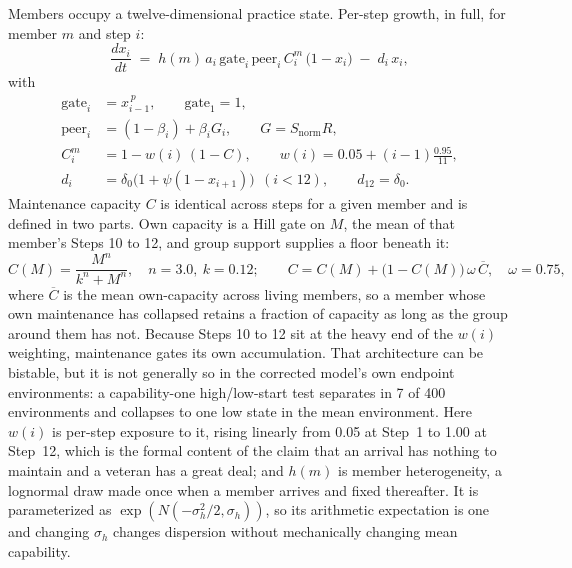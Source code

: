 \documentclass[11pt,a4paper]{article}
\begin{document}
Members occupy a twelve-dimensional practice state. Per-step growth, in full, for
member $m$ and step $i$:
\begin{equation}
\frac{dx_i}{dt} \;=\; h(m)\, a_i\, \mathrm{gate}_i\, \mathrm{peer}_i\, C^{m}_i\,\bigl(1 - x_i\bigr)
 \;-\; d_i\, x_i,
\label{eq:growth}
\end{equation}
with
\begin{align}
\mathrm{gate}_i &= x_{i-1}^{\,p}, \qquad \mathrm{gate}_1 = 1, \\
\mathrm{peer}_i &= (1-\beta_i) + \beta_i G_i, \qquad G = S_{\text{norm}} R, \\
C^{m}_i &= 1 - w(i)\,(1 - C), \qquad w(i) = 0.05 + (i-1)\tfrac{0.95}{11}, \\
d_i &= \delta_0\bigl(1 + \psi(1 - x_{i+1})\bigr) \ \ (i < 12), \qquad d_{12} = \delta_0 .
\end{align}
Maintenance capacity $C$ is identical across steps for a given member and is
defined in two parts. Own capacity is a Hill gate on $M$, the mean of that member's
Steps 10 to 12, and group support supplies a floor beneath it:
\begin{equation}
C(M) = \frac{M^{n}}{k^{n} + M^{n}}, \quad n = 3.0,\ k = 0.12;
\qquad
C = C(M) + \bigl(1 - C(M)\bigr)\,\omega\,\overline{C}, \quad \omega = 0.75,
\label{eq:capacity}
\end{equation}
where $\overline{C}$ is the mean own-capacity across living members, so a member
whose own maintenance has collapsed retains a fraction of capacity as long as the
group around them has not. Because Steps 10 to 12 sit at the heavy end of the
$w(i)$ weighting, maintenance gates its own accumulation. That architecture can be
bistable, but it is not generally so in the corrected model's own endpoint
environments: a capability-one high/low-start test separates in 7 of 400 environments
and collapses to one low state in the mean environment. Here
$w(i)$ is per-step exposure to it, rising linearly from
0.05 at Step~1 to 1.00 at Step~12, which is the formal content of the claim that
an arrival has nothing to maintain and a veteran has a great deal; and $h(m)$ is
member heterogeneity, a lognormal draw made once when a member arrives and fixed
thereafter. It is parameterized as $\exp(N(-\sigma_h^2/2,\sigma_h))$, so its
arithmetic expectation is one and changing $\sigma_h$ changes dispersion without
mechanically changing mean capability.
\end{document}
